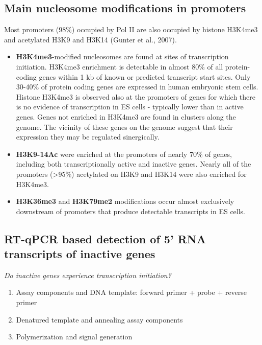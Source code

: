 \hypertarget{main-nucleosome-modifications-in-promoters}{%
\subsection{Main nucleosome modifications in promoters}\label{main-nucleosome-modifications-in-promoters}}

Most promoters (98\%) occupied by Pol II are also occupied by histone H3K4me3 and acetylated H3K9 and H3K14 (Gunter et al., 2007).

\begin{itemize}
\tightlist
\item
  \textbf{H3K4me3}-modified nucleosomes are found at sites of transcription initiation. H3K4me3 enrichment is detectable in almost 80\% of all protein-coding genes within 1 kb of known or predicted transcript start sites. Only 30-40\% of protein coding genes are expressed in human embryonic stem cells. Histone H3K4me3 is observed also at the promoters of genes for which there is no evidence of transcription in ES cells - typically lower than in active genes. Genes not enriched in H3K4me3 are found in clusters along the genome. The vicinity of these genes on the genome suggest that their expression they may be regulated sinergically.
\item
  \textbf{H3K9-14Ac} were enriched at the promoters of nearly 70\% of genes, including both transcriptionally active and inactive genes. Nearly all of the promoters (\textgreater95\%) acetylated on H3K9 and H3K14 were also enriched for H3K4me3.
\item
  \textbf{H3K36me3} and \textbf{H3K79me2} modifications occur almost exclusively downstream of promoters that produce detectable transcripts in ES cells.
\end{itemize}

\hypertarget{rt-qpcr-based-detection-of-5-rna-transcripts-of-inactive-genes}{%
\subsection{RT-qPCR based detection of 5' RNA transcripts of inactive genes}\label{rt-qpcr-based-detection-of-5-rna-transcripts-of-inactive-genes}}
\emph{Do inactive genes experience transcription initiation?}
\begin{enumerate}
\def\labelenumi{\arabic{enumi}.}
\tightlist
\item
  Assay components and DNA template: forward primer + probe + reverse primer
\item
  Denatured template and annealing assay components
\item
  Polymerization and signal generation
\end{enumerate}

